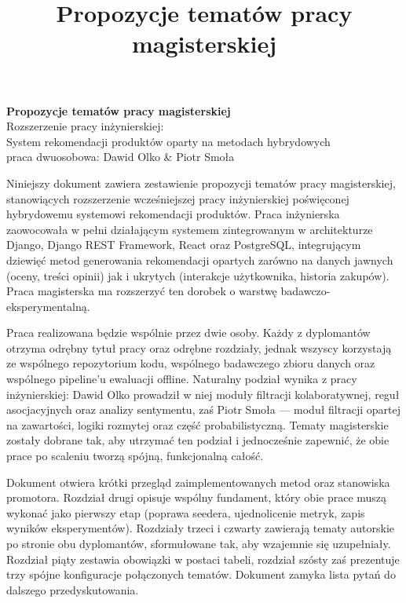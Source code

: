 \documentclass[12pt,a4paper]{article}
\title{\color{primary}\Huge\bfseries Propozycje tematów pracy magisterskiej}
\author{}
\date{}
\begin{document}
\begin{titlepage}
\null\vspace*{4cm}
\begin{center}
{\color{primary}\Huge\bfseries Propozycje tematów pracy magisterskiej}\\[1.2em]
{\color{greytxt}\Large Rozszerzenie pracy inżynierskiej:}\\[0.3em]
{\color{greytxt}\Large System rekomendacji produktów oparty na metodach hybrydowych}\\[0.6em]
{\color{greytxt}\large praca dwuosobowa: Dawid Olko \& Piotr Smoła}
\end{center}

\vspace{2.5cm}

Niniejszy dokument zawiera zestawienie propozycji tematów pracy magisterskiej, stanowiących rozszerzenie wcześniejszej pracy inżynierskiej poświęconej hybrydowemu systemowi rekomendacji produktów. Praca inżynierska zaowocowała w pełni działającym systemem zintegrowanym w architekturze Django, Django REST Framework, React oraz PostgreSQL, integrującym dziewięć metod generowania rekomendacji opartych zarówno na danych jawnych (oceny, treści opinii) jak i ukrytych (interakcje użytkownika, historia zakupów). Praca magisterska ma rozszerzyć ten dorobek o warstwę badawczo-eksperymentalną.

Praca realizowana będzie wspólnie przez dwie osoby. Każdy z dyplomantów otrzyma odrębny tytuł pracy oraz odrębne rozdziały, jednak wszyscy korzystają ze wspólnego repozytorium kodu, wspólnego badawczego zbioru danych oraz wspólnego pipeline’u ewaluacji offline. Naturalny podział wynika z pracy inżynierskiej: Dawid Olko prowadził w niej moduły filtracji kolaboratywnej, reguł asocjacyjnych oraz analizy sentymentu, zaś Piotr Smoła --- moduł filtracji opartej na zawartości, logiki rozmytej oraz część probabilistyczną. Tematy magisterskie zostały dobrane tak, aby utrzymać ten podział i jednocześnie zapewnić, że obie prace po scaleniu tworzą spójną, funkcjonalną całość.

Dokument otwiera krótki przegląd zaimplementowanych metod oraz stanowiska promotora. Rozdział drugi opisuje wspólny fundament, który obie prace muszą wykonać jako pierwszy etap (poprawa seedera, ujednolicenie metryk, zapis wyników eksperymentów). Rozdziały trzeci i czwarty zawierają tematy autorskie po stronie obu dyplomantów, sformułowane tak, aby wzajemnie się uzupełniały. Rozdział piąty zestawia obowiązki w postaci tabeli, rozdział szósty zaś prezentuje trzy spójne konfiguracje połączonych tematów. Dokument zamyka lista pytań do dalszego przedyskutowania.

\end{titlepage}
\end{document}
